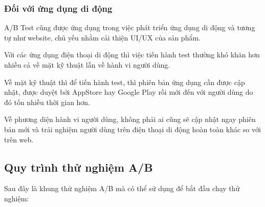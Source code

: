 \subsubsection{Đối với ứng dụng di động}

A/B Test cũng được ứng dụng trong việc phát triển ứng dụng di động và tương tự như website, chủ yếu nhằm cải thiện UI/UX của sản phẩm.

Với các ứng dụng điện thoại di động thì việc tiến hành test thường khó khăn hơn nhiều cả về mặt kỹ thuật lẫn về hành vi người dùng.

Về mặt kỹ thuật thì để tiến hành test, thì phiên bản ứng dụng cần được cập nhật, được duyệt bởi AppStore hay Google Play rồi mới đến với người dùng do đó tốn nhiều thời gian hơn.

Về phương diện hành vi người dùng, không phải ai cũng sẽ cập nhật ngay phiên bản mới và trải nghiệm người dùng trên điện thoại di động hoàn toàn khác so với trên web.

\subsection{Quy trình thử nghiệm A/B}

Sau đây là khung thử nghiệm A/B mà có thể sử dụng để bắt đầu chạy thử nghiệm:


